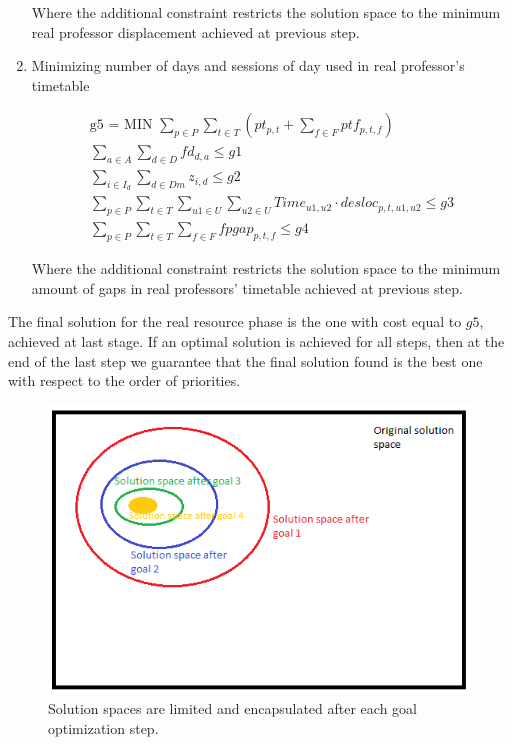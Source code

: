 \begin{enumerate}
Where the additional constraint restricts the solution space to the minimum real professor displacement achieved at previous step.

\item{Minimizing number of days and sessions of day used in real professor's timetable}

\begin{align*}
   \mbox{g5 = MIN  } \sum\limits_{p \in P} \sum\limits_{t \in T} ( pt_{p,t} + \sum\limits_{f \in F} ptf_{p,t,f})
	\\
	\sum\limits_{a \in A}\sum\limits_{d \in D} fd_{d,a} \le g1
	\\
	\sum\limits_{i \in I_{d}} \sum\limits_{d \in Dm} z_{i,d} \le g2
	\\
	\sum\limits_{p \in P} \sum\limits_{t \in T} \sum\limits_{u1 \in U} \sum\limits_{u2 \in U} Time_{u1,u2} \cdot desloc_{p,t,u1,u2} \le g3
	\\
	\sum\limits_{p \in P} \sum\limits_{t \in T} \sum\limits_{f \in F} fpgap_{p,t,f} \le g4
\end{align*}

Where the additional constraint restricts the solution space to the minimum amount of gaps in real professors' timetable achieved at previous step.

\end{enumerate}


The final solution for the real resource phase is the one with cost equal to $g5$, achieved at last stage. If an optimal solution is achieved for all steps, then at the end of the last step we guarantee that the final solution found is the best one with respect to the order of priorities.

\begin{figure}[H]
\includegraphics[scale=0.6]{figures/goalProgSpace.png}
\centering
\caption{Solution spaces are limited and encapsulated after each goal optimization step.}
\end{figure}

